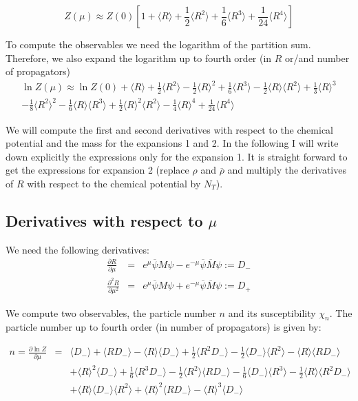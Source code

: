 \documentclass[a4paper,10pt]{report}
\newcommand{\ol}[1]{\overline{#1}}
\newcommand{\rrb}{\overline{\rho}}
\newcommand{\rr}{\rho}
\newcommand{\emu}{e^{\mu}}
\newcommand{\emmu}{e^{-\mu}}
\newcommand{\Mb}{\ol{M}}
\newcommand{\mv}[1]{\langle #1 \rangle}
\begin{document}
\begin{equation}
Z(\mu) \approx Z(0)\left[ 1 + \mv{R} + \frac{1}{2} \mv{R^2} + \frac{1}{6} \mv{R^3} + \frac{1}{24} \mv{R^4} \right]
\end{equation}

\noindent To compute the observables we need the logarithm of the partition
sum.  Therefore, we also expand the logarithm up to fourth order (in $R$ or/and number of propagators)
\begin{eqnarray}
\ln Z(\mu) \approx \ln Z(0) + \mv{R} + \frac{1}{2}\mv{R^2} - \frac{1}{2}\mv{R}^2 
+ \frac{1}{6}\mv{R^3} - \frac{1}{2}\mv{R}\mv{R^2} + \frac{1}{3}\mv{R}^3 \nonumber \\ 
- \frac{1}{8}\mv{R^2}^2 - \frac{1}{6}\mv{R}\mv{R^3} + \frac{1}{2}\mv{R}^2\mv{R^2} - \frac{1}{4}\mv{R}^4 + \frac{1}{24}\mv{R^4} 
\end{eqnarray}


We will compute the first and second derivatives with respect to the chemical potential
and the mass for the expansions 1 and 2.  In the following I will write down explicitly
the expressions only for the expansion 1.  It is straight forward to get the expressions
for expansion 2 (replace $\rr$ and $\rrb$ and multiply the derivatives of $R$ with respect
to the chemical potential by $N_T$).


\subsection*{Derivatives with respect to $\mu$}
We need the following derivatives:
\begin{eqnarray}
\frac{\partial R}{\partial \mu} &=& \emu \ol{\psi}M\psi - \emmu \ol{\psi}\Mb \psi := D_- \\
\frac{\partial^2 R}{\partial \mu^2} &=& \emu \ol{\psi}M\psi + \emmu \ol{\psi}\Mb \psi := D_+
\end{eqnarray}

\noindent We compute two observables, the particle number $n$
and its susceptibility $\chi_n$.  The particle number up to fourth
order (in number of propagators) is given by:

\begin{eqnarray}
n = \frac{\partial \ln Z}{\partial \mu} &=& \mv{D_-} + \mv{RD_-} - \mv{R}\mv{D_-}
    + \frac{1}{2}\mv{R^2D_-} - \frac{1}{2}\mv{D_-}\mv{R^2} - \mv{R}\mv{RD_-}   \nonumber \\
  & & + \mv{R}^2\mv{D_-}+ \frac{1}{6}\mv{R^3D_-} - \frac{1}{2}\mv{R^2}\mv{RD_-}
    - \frac{1}{6}\mv{D_-}\mv{R^3} - \frac{1}{2}\mv{R}\mv{R^2D_-}  \nonumber \\
  & & + \mv{R}\mv{D_-}\mv{R^2} + \mv{R}^2\mv{RD_-} - \mv{R}^3\mv{D_-}
\end{eqnarray}
\end{document}
